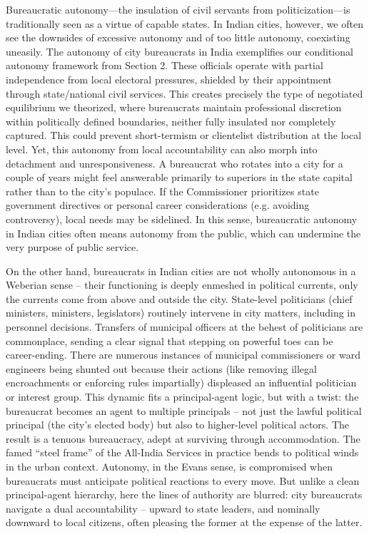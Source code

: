 Bureaucratic autonomy—the insulation of civil servants from politicization—is traditionally seen as a virtue of capable states. In Indian cities, however, we often see the downsides of excessive autonomy and of too little autonomy, coexisting uneasily. The autonomy of city bureaucrats in India exemplifies our conditional autonomy framework from Section 2. These officials operate with partial independence from local electoral pressures, shielded by their appointment through state/national civil services. This creates precisely the type of negotiated equilibrium we theorized, where bureaucrats maintain professional discretion within politically defined boundaries, neither fully insulated nor completely captured. This could prevent short-termism or clientelist distribution at the local level. Yet, this autonomy from local accountability can also morph into detachment and unresponsiveness. A bureaucrat who rotates into a city for a couple of years might feel answerable primarily to superiors in the state capital rather than to the city's populace. If the Commissioner prioritizes state government directives or personal career considerations (e.g. avoiding controversy), local needs may be sidelined. In this sense, bureaucratic autonomy in Indian cities often means autonomy from the public, which can undermine the very purpose of public service.

On the other hand, bureaucrats in Indian cities are not wholly autonomous in a Weberian sense – their functioning is deeply enmeshed in political currents, only the currents come from above and outside the city. State-level politicians (chief ministers, ministers, legislators) routinely intervene in city matters, including in personnel decisions. Transfers of municipal officers at the behest of politicians are commonplace, sending a clear signal that stepping on powerful toes can be career-ending. There are numerous instances of municipal commissioners or ward engineers being shunted out because their actions (like removing illegal encroachments or enforcing rules impartially) displeased an influential politician or interest group. This dynamic fits a principal-agent logic, but with a twist: the bureaucrat becomes an agent to multiple principals – not just the lawful political principal (the city's elected body) but also to higher-level political actors. The result is a tenuous bureaucracy, adept at surviving through accommodation. The famed ``steel frame'' of the All-India Services in practice bends to political winds in the urban context. Autonomy, in the Evans sense, is compromised when bureaucrats must anticipate political reactions to every move. But unlike a clean principal-agent hierarchy, here the lines of authority are blurred: city bureaucrats navigate a dual accountability – upward to state leaders, and nominally downward to local citizens, often pleasing the former at the expense of the latter.

